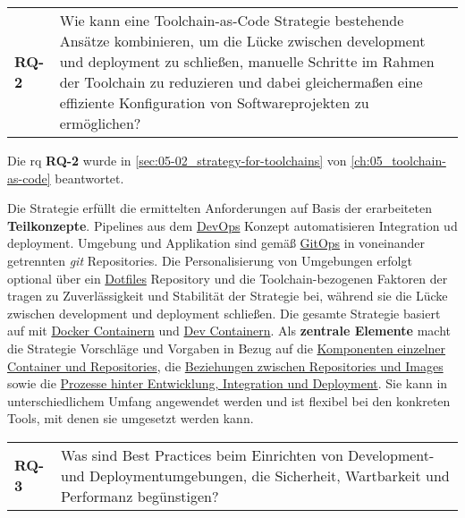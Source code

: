 \vspace{1em}
\begin{table}[H]
    \centering
    \begin{tabular}{p{} p{}}
        \textbf{RQ-2} & Wie kann eine Toolchain-as-Code Strategie bestehende Ansätze kombinieren, um die Lücke zwischen \Gls{development} und \Gls{deployment} zu schließen, manuelle Schritte im Rahmen der Toolchain zu reduzieren und dabei gleichermaßen eine effiziente Konfiguration von Softwareprojekten zu ermöglichen?
    \end{tabular}
\end{table}

Die \acrlong{rq} \textbf{RQ-2} wurde in \autoref{sec:05-02_strategy-for-toolchains} von \autoref{ch:05_toolchain-as-code} beantwortet.

Die  Strategie erfüllt die ermittelten Anforderungen auf Basis der erarbeiteten \textbf{Teilkonzepte}. Pipelines aus dem \hyperref[sec:03-01_introduction-to-devops]{DevOps} Konzept automatisieren Integration ud \Gls{deployment}. Umgebung und Applikation sind gemäß \hyperref[sec:03-03_gitops-as-further-evolution]{GitOps} in voneinander getrennten \textit{\Gls{git}} Repositories. Die Personalisierung von Umgebungen erfolgt optional über ein \hyperref[sec:03-04_idea-of-dotfiles]{Dotfiles} Repository und die Toolchain-bezogenen Faktoren der  tragen zu Zuverlässigkeit und Stabilität der Strategie bei, während sie die Lücke zwischen \Gls{development} und \Gls{deployment} schließen. Die gesamte Strategie basiert auf \textbf{} mit \hyperref[subsec:05-01-01_docker-container]{Docker Containern} und \hyperref[subsec:05-01-02_dev-container]{Dev Containern}. Als \textbf{zentrale Elemente} macht die Strategie Vorschläge und Vorgaben in Bezug auf die \hyperref[subsubsec:05-02-02-02_sub-components-in-environments]{Komponenten einzelner Container und Repositories}, die \hyperref[subsubsec:05-02-02-01_data-storage-in-repositories]{Beziehungen zwischen Repositories und Images} sowie die \hyperref[subsec:05-02-03_workflows-and-continuity-in-the-toolchain-as-code-approach]{Prozesse hinter Entwicklung, Integration und Deployment}. Sie kann in unterschiedlichem Umfang angewendet werden und ist flexibel bei den konkreten Tools, mit denen sie umgesetzt werden kann.

\vspace{1em}
\begin{table}[H]
    \centering
    \begin{tabular}{p{} p{}}
        \textbf{RQ-3} & Was sind Best Practices beim Einrichten von Development- und Deploymentumgebungen, die Sicherheit, Wartbarkeit und Performanz begünstigen? \\
    \end{tabular}
\end{table}

